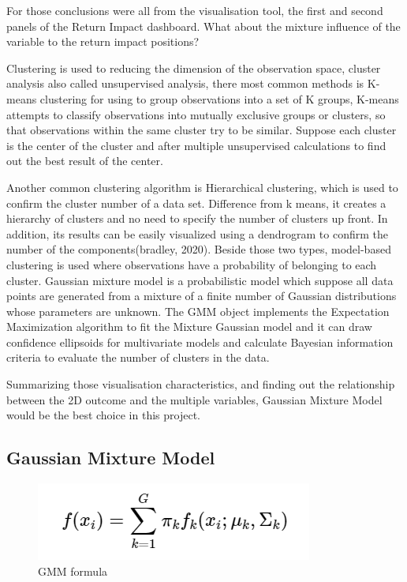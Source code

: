 \documentclass[11pt,a4paper,]{article}
\begin{document}
For those conclusions were all from the visualisation tool, the first and second panels of the Return Impact dashboard. What about the mixture influence of the variable to the return impact positions?

Clustering is used to reducing the dimension of the observation space, cluster analysis also called unsupervised analysis, there most common methods is K-means clustering for using to group observations into a set of K groups, K-means attempts to classify observations into mutually exclusive groups or clusters, so that observations within the same cluster try to be similar. Suppose each cluster is the center of the cluster and after multiple unsupervised calculations to find out the best result of the center.

Another common clustering algorithm is Hierarchical clustering, which is used to confirm the cluster number of a data set. Difference from k means, it creates a hierarchy of clusters and no need to specify the number of clusters up front. In addition, its results can be easily visualized using a dendrogram to confirm the number of the components(bradley, 2020). Beside those two types, model-based clustering is used where observations have a probability of belonging to each cluster. Gaussian mixture model is a probabilistic model which suppose all data points are generated from a mixture of a finite number of Gaussian distributions whose parameters are unknown. The GMM object implements the Expectation Maximization algorithm to fit the Mixture Gaussian model and it can draw confidence ellipsoids for multivariate models and calculate Bayesian information criteria to evaluate the number of clusters in the data\autocite{stickit}.

Summarizing those visualisation characteristics, and finding out the relationship between the 2D outcome and the multiple variables, Gaussian Mixture Model would be the best choice in this project.

\hypertarget{gaussian-mixture-model}{%
\subsection{Gaussian Mixture Model}\label{gaussian-mixture-model}}

\begin{figure}

{\centering \includegraphics[width=1\linewidth]{image/GMM} 

}

\caption{GMM formula}\label{fig:gmm}
\end{figure}
\end{document}
